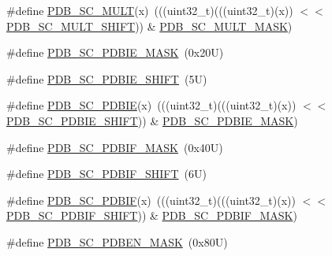 \begin{DoxyCompactItemize}
\#define \mbox{\hyperlink{group___p_d_b___register___masks_ga52e674d4841cbe8d87374deadb69b45f}{P\+D\+B\+\_\+\+S\+C\+\_\+\+M\+U\+LT}}(x)~(((uint32\+\_\+t)(((uint32\+\_\+t)(x)) $<$$<$ \mbox{\hyperlink{group___p_d_b___register___masks_gaaf1dfea7eddb56850efd85b75d659ef8}{P\+D\+B\+\_\+\+S\+C\+\_\+\+M\+U\+L\+T\+\_\+\+S\+H\+I\+FT}})) \& \mbox{\hyperlink{group___p_d_b___register___masks_ga86e3ec0c9f5ec6d0bbc1ebcf20774b38}{P\+D\+B\+\_\+\+S\+C\+\_\+\+M\+U\+L\+T\+\_\+\+M\+A\+SK}})
\item 
\#define \mbox{\hyperlink{group___p_d_b___register___masks_ga153222e454507310871a217b8ede92fd}{P\+D\+B\+\_\+\+S\+C\+\_\+\+P\+D\+B\+I\+E\+\_\+\+M\+A\+SK}}~(0x20\+U)
\item 
\#define \mbox{\hyperlink{group___p_d_b___register___masks_ga8632d420c92ec79e08c43f7d3acc79cf}{P\+D\+B\+\_\+\+S\+C\+\_\+\+P\+D\+B\+I\+E\+\_\+\+S\+H\+I\+FT}}~(5\+U)
\item 
\#define \mbox{\hyperlink{group___p_d_b___register___masks_ga98dcac8748ba0eeee4470cedcbbd6e8e}{P\+D\+B\+\_\+\+S\+C\+\_\+\+P\+D\+B\+IE}}(x)~(((uint32\+\_\+t)(((uint32\+\_\+t)(x)) $<$$<$ \mbox{\hyperlink{group___p_d_b___register___masks_ga8632d420c92ec79e08c43f7d3acc79cf}{P\+D\+B\+\_\+\+S\+C\+\_\+\+P\+D\+B\+I\+E\+\_\+\+S\+H\+I\+FT}})) \& \mbox{\hyperlink{group___p_d_b___register___masks_ga153222e454507310871a217b8ede92fd}{P\+D\+B\+\_\+\+S\+C\+\_\+\+P\+D\+B\+I\+E\+\_\+\+M\+A\+SK}})
\item 
\#define \mbox{\hyperlink{group___p_d_b___register___masks_ga57cd111abf2b5780daddb6619498ef7a}{P\+D\+B\+\_\+\+S\+C\+\_\+\+P\+D\+B\+I\+F\+\_\+\+M\+A\+SK}}~(0x40\+U)
\item 
\#define \mbox{\hyperlink{group___p_d_b___register___masks_ga98ea01f76c8cc1bc944830d4d8387118}{P\+D\+B\+\_\+\+S\+C\+\_\+\+P\+D\+B\+I\+F\+\_\+\+S\+H\+I\+FT}}~(6\+U)
\item 
\#define \mbox{\hyperlink{group___p_d_b___register___masks_ga8c8a7204d308d7eca70a024dae1beb11}{P\+D\+B\+\_\+\+S\+C\+\_\+\+P\+D\+B\+IF}}(x)~(((uint32\+\_\+t)(((uint32\+\_\+t)(x)) $<$$<$ \mbox{\hyperlink{group___p_d_b___register___masks_ga98ea01f76c8cc1bc944830d4d8387118}{P\+D\+B\+\_\+\+S\+C\+\_\+\+P\+D\+B\+I\+F\+\_\+\+S\+H\+I\+FT}})) \& \mbox{\hyperlink{group___p_d_b___register___masks_ga57cd111abf2b5780daddb6619498ef7a}{P\+D\+B\+\_\+\+S\+C\+\_\+\+P\+D\+B\+I\+F\+\_\+\+M\+A\+SK}})
\item 
\#define \mbox{\hyperlink{group___p_d_b___register___masks_ga5582f0b88e7ae5e9dcf69f3a859c4470}{P\+D\+B\+\_\+\+S\+C\+\_\+\+P\+D\+B\+E\+N\+\_\+\+M\+A\+SK}}~(0x80\+U)
\item 
$$
\end{DoxyCompactItemize}
